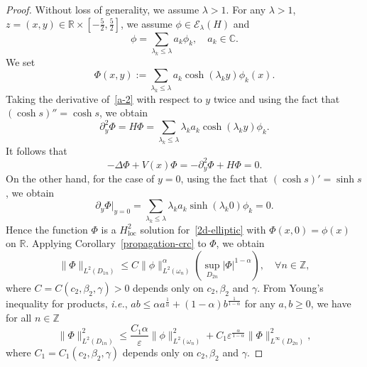 \documentclass{amsart}
\newcommand\R{\ensuremath{\mathbb{R}}}
\newcommand\Z{\ensuremath{\mathbb{Z}}}
\newcommand\C{\ensuremath{\mathbb{C}}}
\theoremstyle{definition}
\begin{document}
\begin{proof}
	Without loss of generality, we assume $\lambda>1$. For any $\lambda>1$, $\displaystyle z=(x,y) \in \R\times \left[ -\frac{5}{2},\frac{5}{2} \right] $, we assume $\phi \in \mathcal{E}_{\lambda}(H)$ and 
	\begin{equation}
		\phi=\sum_{\lambda_k\le \lambda} a_k \phi_k,\quad a_k \in \C.
	\end{equation}
	We set
	\begin{equation}
		\Phi(x,y):=\sum_{\lambda_k\le\lambda}a_k\cosh(\lambda_k y)\phi_k(x).\label{a-2}
	\end{equation}
	Taking the derivative of~\eqref{a-2} with respect to $y$ twice and using the fact that $(\cosh s)''=\cosh s$, we obtain
	\begin{equation}
		\partial_{y}^2 \Phi=H\Phi=\sum_{\lambda_k\le \lambda}\lambda_ka_k\cosh(\lambda_ky)\phi_k.
	\end{equation}
	It follows that
	\begin{equation}
		-\Delta \Phi+V(x)\Phi=-\partial^2_{y}\Phi+H\Phi=0.
	\end{equation}
	On the other hand, for the case of  $y=0$, using the fact that $(\cosh s)'=\sinh s$, we obtain
	\begin{equation}
		\partial_y \Phi\lvert_{y=0}=\sum_{\lambda_k\le \lambda}\lambda_ka_k\sinh(\lambda_k 0)\phi_k=0.
	\end{equation}
	Hence the function $\Phi$ is a $H^2_{\mathrm{loc}}$ solution for~\eqref{2d-elliptic} with $\Phi(x,0)=\phi(x)$ on $\R$.
	Applying Corollary~\ref{propagation-crc} to $\Phi$, we obtain
	\begin{equation}
		\|\Phi\|_{L^2(D_{1n})}\le C\|\phi\|^{\alpha}_{L^2(\omega_n)}\left( \sup_{D_{2n}}|\Phi|^{1-\alpha} \right),\quad \forall n\in \Z, 
	\end{equation}
	where $C=C(c_2,\beta_2,\gamma)>0$ depends only on $c_2,\beta_2$ and $\gamma$.
	From Young's inequality for products, {\it{i.e.}}, $\displaystyle ab\le \alpha a^{\frac{1}{\alpha}}+(1-\alpha) b^{\frac{1}{1-\alpha}}$ for any $a,b\ge 0$, we have for all $n\in \Z$
	\begin{equation}\label{a-3}
		\|\Phi\|^2_{L^2(D_{1n})}\le \frac{C_1\alpha}{\varepsilon }\|\phi\|^2_{L^2(\omega_n)}+C_1\varepsilon ^{\frac{\alpha}{1-\alpha}}\|\Phi\|^2_{L^{\infty}(D_{2n})},
	\end{equation}
	where $C_1=C_1(c_2,\beta_2,\gamma)$ depends only on $c_2,\beta_2$ and $\gamma$. 


\end{proof}
\end{document}
